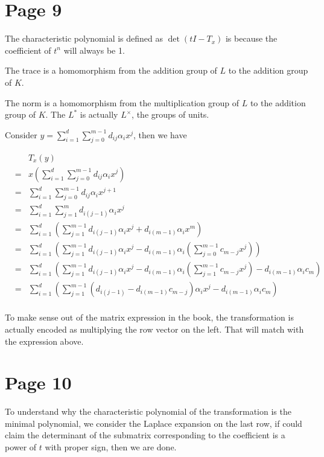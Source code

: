 \documentclass{article}
\begin{document}
\section*{Page 9}
The characteristic polynomial is defined as $ \det(tI - T_x) $ is because the coefficient of $ t^n $ will always be 1.

The trace is a homomorphism from the addition group of $ L $ to the addition group of $ K $.

The norm is a homomorphism from the multiplication group of $ L $ to the addition group of $ K $. The $ L^* $ is actually $ L^{\times} $, the groups of units.

Consider $ y = \sum_{i=1}^{d}\sum_{j=0}^{m-1}d_{ij}\alpha_i x^j $, then we have

\begin{eqnarray*}
  & & T_x(y) \\
  &=& x(\sum_{i=1}^{d}\sum_{j=0}^{m-1}d_{ij}\alpha_i x^j) \\
  &=& \sum_{i=1}^{d}\sum_{j=0}^{m-1}d_{ij}\alpha_i x^{j+1} \\
  &=& \sum_{i=1}^{d}\sum_{j=1}^{m}d_{i(j-1)}\alpha_i x^j \\
  &=& \sum_{i=1}^{d}(\sum_{j=1}^{m-1}d_{i(j-1)}\alpha_i x^j + d_{i(m-1)}\alpha_i x^m) \\
  &=& \sum_{i=1}^{d}(\sum_{j=1}^{m-1}d_{i(j-1)}\alpha_i x^j - d_{i(m-1)}\alpha_i(\sum_{j=0}^{m-1}c_{m-j}x^j)) \\
  &=& \sum_{i=1}^{d}(\sum_{j=1}^{m-1}d_{i(j-1)}\alpha_i x^j - d_{i(m-1)}\alpha_i(\sum_{j=1}^{m-1}c_{m-j}x^j) - d_{i(m-1)}\alpha_ic_m) \\
  &=& \sum_{i=1}^{d}(\sum_{j=1}^{m-1}(d_{i(j-1)} - d_{i(m-1)}c_{m-j}) \alpha_i x^j - d_{i(m-1)}\alpha_ic_m) \\
\end{eqnarray*}

To make sense out of the matrix expression in the book, the transformation is actually encoded as multiplying the row vector on the left. That will match with the expression above.

\section*{Page 10}
To understand why the characteristic polynomial of the transformation is the minimal polynomial, we consider the Laplace expansion on the last row, if could claim the determinant of the submatrix corresponding to the coefficient is a power of $ t $ with proper sign, then we are done.
\end{document}
